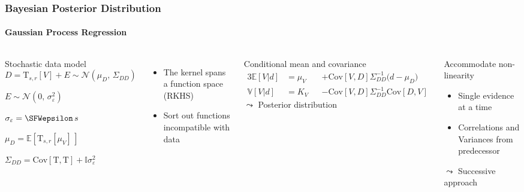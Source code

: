 \documentclass[aspectratio=169, t, 10pt, ignorenonframetext]{beamer}
\newcommand\Mean[1]{\mathbb{E}\!\left[#1\right]}
\newcommand\Var[1]{\mathbb{V}\!\left[#1\right]}
\newcommand\Cov[2]{\mathrm{Cov}\!\left[#1,#2\right]}
\newcommand\Gauss[2]{\mathcal{N}\!\left({#1},\,{#2}\right)}
\newcommand{\Identity}{\mathbb{I}}
\begin{document}
\begin{frame}
    \frametitle{Bayesian Posterior Distribution}
    \framesubtitle{Gaussian Process Regression}

\begin{columns}

    \begin{block}{Stochastic data model}
        \begin{equation}
            D = \mathrm T_{s,r}[V] + E \sim \Gauss{\mu_D}{\Sigma_{DD}}
        \end{equation}
        \begin{description}[labelwidth=25mm]
            \item [Error model]        $E\sim \Gauss{0}{\sigma_\varepsilon^2}$
            \item [Uncertainty]        $\sigma_\varepsilon = \SFWepsilon\,s$
            \item [Prior travel times] $\mu_D = \Mean{\mathrm T_{s,r}[\mu_V]\,}$
            \item [Covariance matrix]  $\Sigma_{DD} = \Cov{\mathrm T}{\mathrm T}  + \Identity \sigma_\varepsilon^2$
        \end{description}
    \end{block}

    \begin{itemize}
        \item The kernel spans a function space (RKHS)
        \item Sort out functions incompatible with data
    \end{itemize}


    \begin{exampleblock}{Conditional mean and covariance}
        \setlength\abovedisplayskip{0pt}
        \begin{alignat}{3}
            \Mean{V|d} &= \mu_V &&+ \Cov VD \Sigma_{DD}^{-1} \big( d - \mu_{D} \big)
            \\
            \Var{V|d}  &= K_V   &&- \Cov VD \Sigma_{DD}^{-1} \Cov DV
        \end{alignat}
        \hfill {\Large $\leadsto$} Posterior distribution \phantom{p}
    \end{exampleblock}

    \begin{alertblock}{Accommodate non-linearity}
        \begin{itemize}
            \item Single evidence at a time
            \item Correlations and Variances from predecessor
        \end{itemize}
        \hfill {\Large $\leadsto$} Successive approach ~
    \end{alertblock}

\end{columns}

\end{frame}
\end{document}
